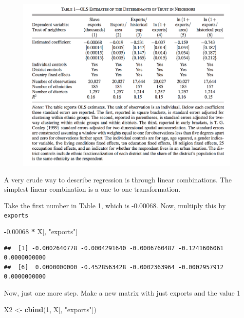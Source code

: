 \documentclass[]{book}
\newenvironment{Shaded}{\begin{snugshade}}{\end{snugshade}}
\newcommand{\KeywordTok}[1]{\textcolor[rgb]{0.13,0.29,0.53}{\textbf{#1}}}
\newcommand{\DecValTok}[1]{\textcolor[rgb]{0.00,0.00,0.81}{#1}}
\newcommand{\FloatTok}[1]{\textcolor[rgb]{0.00,0.00,0.81}{#1}}
\newcommand{\StringTok}[1]{\textcolor[rgb]{0.31,0.60,0.02}{#1}}
\newcommand{\OperatorTok}[1]{\textcolor[rgb]{0.81,0.36,0.00}{\textbf{#1}}}
\newcommand{\NormalTok}[1]{#1}
\theoremstyle{definition}
\theoremstyle{definition}
\theoremstyle{definition}
\theoremstyle{remark}
\begin{document}
\begin{figure}
\centering
\includegraphics{nunn_wantchekon_table1.png}
\caption{}
\end{figure}

A very crude way to describe regression is through linear combinations.
The simplest linear combination is a one-to-one transformation.

Take the first number in Table 1, which is -0.00068. Now, multiply this
by \texttt{exports}

\begin{Shaded}
\begin{Highlighting}[]
\OperatorTok{-}\FloatTok{0.00068} \OperatorTok{*}\StringTok{ }\NormalTok{X[, }\StringTok{"exports"}\NormalTok{]}
\end{Highlighting}
\end{Shaded}

\begin{verbatim}
##  [1] -0.0002640778 -0.0004291640 -0.0006760487 -0.1241606061  0.0000000000
##  [6]  0.0000000000 -0.4528563428 -0.0002363964 -0.0002957912  0.0000000000
\end{verbatim}

Now, just one more step. Make a new matrix with just exports and the
value 1

\begin{Shaded}
\begin{Highlighting}[]
\NormalTok{X2 <-}\StringTok{ }\KeywordTok{cbind}\NormalTok{(}\DecValTok{1}\NormalTok{, X[, }\StringTok{"exports"}\NormalTok{])}
\end{Highlighting}
\end{Shaded}
\end{document}
